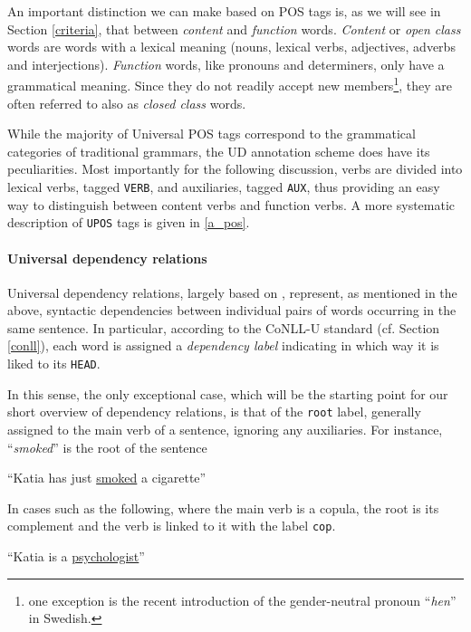 An important distinction we can make based on POS tags is, as we will see in Section \ref{criteria}, that between \textit{content} and \textit{function} words.
\textit{Content} or \textit{open class} words are words with a lexical meaning (nouns, lexical verbs, adjectives, adverbs and interjections).
\textit{Function} words, like pronouns and determiners, only have a grammatical meaning. Since they do not readily accept new members\footnote{one exception is the recent introduction of the gender-neutral pronoun ``\textit{hen}'' in Swedish.}, they are often referred to also as \textit{closed class} words. \smallskip

While the majority of Universal POS tags correspond to the grammatical categories of traditional grammars, the UD annotation scheme does have its peculiarities. 
Most importantly for the following discussion, verbs are divided into lexical verbs, tagged \texttt{VERB}, and auxiliaries, tagged \texttt{AUX}, thus providing an easy way to distinguish between content verbs and function verbs. 
A more systematic description of \texttt{UPOS} tags is given in \ref{a_pos}.

\paragraph{Universal dependency relations}
Universal dependency relations, largely based on \cite{st2}, represent, as mentioned in the above, syntactic dependencies between individual pairs of words occurring in the same sentence. 
In particular, according to the CoNLL-U standard (cf. Section \ref{conll}), each word is assigned a \textit{dependency label} indicating in which way it is liked to its \texttt{HEAD}. \smallskip 

In this sense, the only exceptional case, which will be the starting point for our short overview of dependency relations, is that of the \texttt{root} label, generally assigned to the main verb of a sentence, ignoring any auxiliaries. 
For instance, ``\textit{smoked}'' is the root of the sentence \smallskip

\begin{example} \label{katia1}
    ``Katia has just \underline{smoked} a cigarette''
\end{example} \smallskip

In cases such as the following, where the main verb is a copula, the root is its complement and the verb is linked to it with the label \texttt{cop}. \smallskip

\begin{example} \label{katia2}
    ``Katia is a \underline{psychologist}''
\end{example} \smallskip

